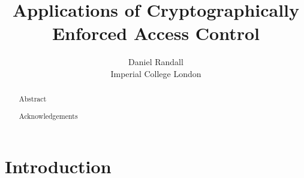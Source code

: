 \documentclass[12pt, titlepage]{article}
\title{Applications of Cryptographically Enforced Access Control}
\author{Daniel Randall \\ Imperial College London}
\date{}
\begin{document}
\maketitle

\begin{abstract}
Abstract
\end{abstract}

\renewcommand{\abstractname}{Acknowledgements}
\begin{abstract}
Acknowledgements
\end{abstract}


\newpage
\tableofcontents
\newpage

\newcommand{\defeq}{\stackrel{\textup{\tiny def}}{=}}

\section{Introduction}
\end{document}
